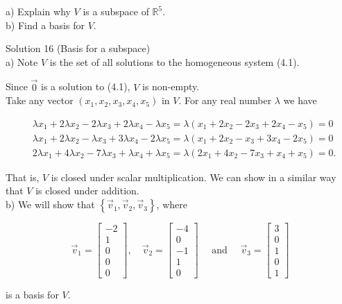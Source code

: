 \documentclass[10pt]{article}
\begin{document}
a) Explain why $V$ is a subspace of $\mathbb{R}^{5}$.\\
b) Find a basis for $V$.

Solution 16 (Basis for a subspace)\\
a) Note $V$ is the set of all solutions to the homogeneous system (4.1).

Since $\overrightarrow{0}$ is a solution to (4.1), $V$ is non-empty.\\
Take any vector $\left(x_{1}, x_{2}, x_{3}, x_{4}, x_{5}\right)$ in $V$. For any real number $\lambda$ we have

$$
\begin{aligned}
& \lambda x_{1}+2 \lambda x_{2}-2 \lambda x_{3}+2 \lambda x_{4}-\lambda x_{5}=\lambda\left(x_{1}+2 x_{2}-2 x_{3}+2 x_{4}-x_{5}\right)=0 \\
& \lambda x_{1}+2 \lambda x_{2}-\lambda x_{3}+3 \lambda x_{4}-2 \lambda x_{5}=\lambda\left(x_{1}+2 x_{2}-x_{3}+3 x_{4}-2 x_{5}\right)=0 \\
& 2 \lambda x_{1}+4 \lambda x_{2}-7 \lambda x_{3}+\lambda x_{4}+\lambda x_{5}=\lambda\left(2 x_{1}+4 x_{2}-7 x_{3}+x_{4}+x_{5}\right)=0 .
\end{aligned}
$$

That is, $V$ is closed under scalar multiplication. We can show in a similar way that $V$ is closed under addition.\\
b) We will show that $\left\{\vec{v}_{1}, \vec{v}_{2}, \vec{v}_{3}\right\}$, where

$$
\vec{v}_{1}=\left[\begin{array}{c}
-2 \\
1 \\
0 \\
0 \\
0
\end{array}\right], \quad \vec{v}_{2}=\left[\begin{array}{c}
-4 \\
0 \\
-1 \\
1 \\
0
\end{array}\right] \quad \text { and } \quad \vec{v}_{3}=\left[\begin{array}{l}
3 \\
0 \\
1 \\
0 \\
1
\end{array}\right]
$$

is a basis for $V$.
\end{document}
